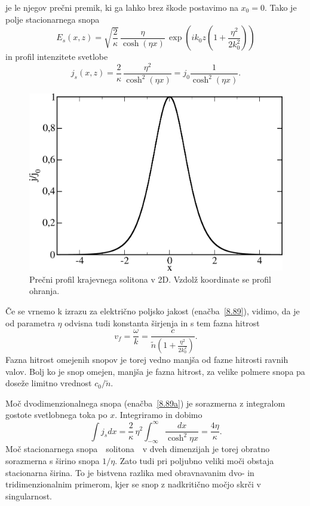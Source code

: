 je le njegov prečni premik, ki ga lahko brez škode postavimo na $x_0=0$. Tako
je polje stacionarnega snopa 
\begin{equation}
E_{s}(x,z)=\sqrt{\frac{2}{\kappa}}\,\frac{\eta}{\cosh(\eta x)}\,\exp\left(ik_{0}z\left(1+
\frac{\eta^{2}}{2k_{0}^{2}}\right)\right)
\label{8.89}
\end{equation}
in profil intenzitete svetlobe
\begin{equation}
j_{s}(x,z)=\frac{2}{\kappa}\,\frac{\eta^2}{\cosh^2(\eta x)} = j_0 \frac{1}{\cosh^2(\eta x)}.
\label{8.89a}
\end{equation}
\begin{figure}[h]
\centering
\includegraphics[width=8truecm]{slike/08_soliton.png}
\caption{Prečni profil krajevnega solitona v 2D. Vzdolž koordinate  se profil ohranja.}
\label{fig:soliton}
\end{figure}
Če se vrnemo k izrazu za električno poljsko jakost (enačba~\ref{8.89}), vidimo, da
je od parametra $\eta$ odvisna tudi konstanta širjenja in s tem fazna hitrost
\begin{equation}
v_{f}=\frac{\omega}{k} = \frac{c}{\tilde{n}\left(1+\frac{\eta^{2}}{2k_{0}^{2}}\right)}.
\end{equation}
Fazna hitrost omejenih snopov je torej vedno manjša od fazne hitrosti ravnih valov. 
Bolj ko je snop omejen, manjša je fazna hitrost, za velike polmere snopa pa doseže 
limitno vrednost $c_0/\tilde{n}$.

Moč dvodimenzionalnega snopa (enačba~\ref{8.89a}) je sorazmerna z integralom
gostote svetlobnega toka po $x$. Integriramo in dobimo 
\begin{equation}
\int j_sdx =\frac{2}{\kappa}\,\eta^{2}\int_{-\infty}^{\infty}\frac{dx}
{\cosh^{2}\eta x}=\frac{4\eta}{\kappa}.
\end{equation}
Moč stacionarnega snopa~\textendash~solitona~\textendash~v dveh dimenzijah je 
torej obratno sorazmerna s širino snopa $1/\eta$. Zato tudi pri poljubno veliki moči 
obstaja stacionarna širina. To je bistvena razlika med obravnavanim dvo- in 
tridimenzionalnim primerom, kjer se snop z nadkritično močjo skrči v singularnost.

